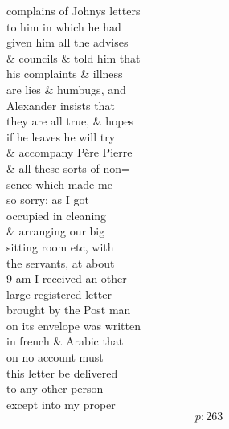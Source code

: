 \documentclass{report}
\begin{document}

	\par{
 	complains of Johnys letters\ \\to him in which he had\ \\given him all the advises\ \\\& councils \& told him that\ \\his complaints \& illness\ \\are lies \& humbugs, and\ \\Alexander insists that\ \\they are all true, \& hopes\ \\if he leaves he will try\ \\\& accompany Père Pierre\ \\\& all these sorts of non=\ \\sence which made me\ \\so sorry; as I got\ \\occupied in cleaning\ \\\& arranging our big\ \\sitting room etc, with\ \\the servants, at about\ \\9 am I received an other\ \\large registered letter\ \\brought by the Post man\ \\on its envelope was written\ \\in french \& Arabic that\ \\on no account must\ \\this letter be delivered\ \\to any other person\ \\except into my proper\ \\
  \[p: 263 \]

	}



\end{document}
